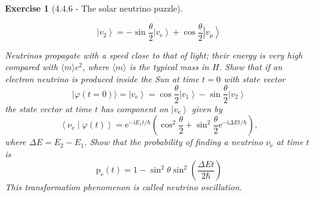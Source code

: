 \documentclass[12pt]{article}
\def\be{\begin{equation}}
\def\ee{\end{equation}}
\def\bea{\begin{eqnarray*}}
\def\eea{\end{eqnarray*}}
\def\l{\left}
\def\r{\right}
\newtheorem{exercise}{Exercise}
\begin{document}
\begin{exercise}[4.4.6 - The solar neutrino puzzle]
\begin{exercises}
\begin{multianswer}
				\be
					\left|v_{2}\right\rangle=-\sin \frac{\theta}{2}\left|v_{\mathrm{e}}\right\rangle+\cos \frac{\theta}{2}\left|v_{\mu}\right\rangle
				\ee
			\end{multianswer}
			\item Neutrinos propagate with a speed close to that of light; their energy is very high compared with $\langle m\rangle c^{2}$, where $\langle m\rangle$ is the typical mass in $H$. Show that if an electron neutrino is produced inside the Sun at time $t=0$ with state vector
			$$
			|\varphi(t=0)\rangle=\left|v_{\mathrm{e}}\right\rangle=\cos \frac{\theta}{2}\left|v_{1}\right\rangle-\sin \frac{\theta}{2}\left|v_{2}\right\rangle
			$$
			the state vector at time $t$ has component on $\left|v_{\mathrm{e}}\right\rangle$ given by
			$$
			\left\langle\nu_{\mathrm{e}} \mid \varphi(t)\right\rangle=\mathrm{e}^{-\mathrm{i} E_{1} t / \hbar}\left(\cos ^{2} \frac{\theta}{2}+\sin ^{2} \frac{\theta}{2} \mathrm{e}^{-\mathrm{i} \Delta E t / \hbar}\right),
			$$
			where $\Delta E=E_{2}-E_{1}$. Show that the probability of finding a neutrino $\nu_{\mathrm{e}}$ at time $t$ is
			$$
			\mathrm{p}_{\mathrm{e}}(t)=1-\sin ^{2} \theta \sin ^{2}\left(\frac{\Delta E t}{2 \hbar}\right)
			$$
			This transformation phenomenon is called neutrino oscillation.
\end{exercises}
\end{exercise}
\end{document}
